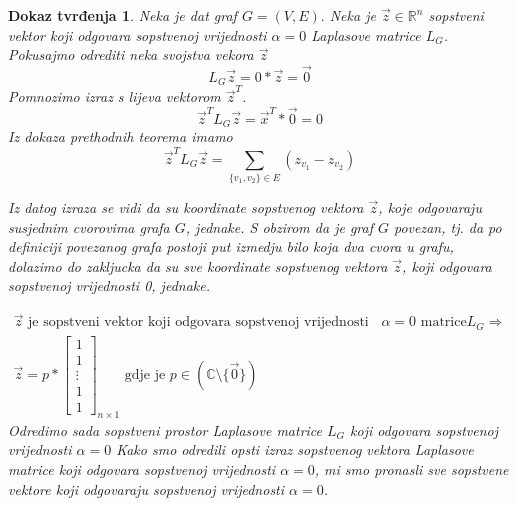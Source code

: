 \documentclass[11pt]{article}
\newtheorem*{custom_proof}{Dokaz tvrđenja}
\begin{document}
	\begin{custom_proof}
	Neka je dat graf $G=(V,E).$ Neka je $\vec{z} \in \mathbb{R}^n$ sopstveni vektor koji odgovara sopstvenoj vrijednosti $\alpha = 0$ Laplasove matrice $L_G$.
	Pokusajmo odrediti neka svojstva vekora $\vec{z}$
	\[
		L_G\vec{z} = 0 * \vec{z} = \vec{0}
	\]
	Pomnozimo izraz s lijeva vektorom $\vec{z}^T$.
	\[
		\vec{z}^TL_G\vec{z} = \vec{x}^T * \vec{0} = 0
	\]
	Iz dokaza prethodnih teorema imamo 
	\[
	\vec{z}^TL_G\vec{z} = \sum_{\{v_1,v_2\} \in E} (z_{v_1} - z_{v_2})
	\]
	
	Iz datog izraza se vidi da su koordinate sopstvenog vektora $\vec{z}$, koje odgovaraju susjednim cvorovima grafa $G$, jednake. S obzirom da je graf $G$ povezan, tj. da po definiciji povezanog grafa postoji put izmedju bilo koja dva cvora u grafu, dolazimo do zakljucka da su sve koordinate sopstvenog vektora $\vec{z}$, koji odgovara sopstvenoj vrijednosti 0, jednake. 
	
	\[
	\begin{split}
	 \vec{z} \text{  je sopstveni vektor koji odgovara sopstvenoj vrijednosti } & \alpha = 0 \text{ matrice}  L_G \Rightarrow \\
	 \vec{z} =p *
	\begin{bmatrix} 
	1 \\ 1 \\ \vdots \\ 1 \\ 1
	\end{bmatrix}_{n \times 1}
	\text{ gdje je } p \in (\mathbb{C} \setminus \{\vec{0}\})
	\end{split}
	\]
	Odredimo sada sopstveni prostor Laplasove matrice $L_G$ koji odgovara sopstvenoj vrijednosti $\alpha = 0$
	Kako smo odredili opsti izraz sopstvenog vektora Laplasove matrice koji odgovara sopstvenoj vrijednosti $\alpha = 0$, mi smo pronasli sve sopstvene vektore koji odgovaraju sopstvenoj vrijednosti $\alpha = 0$.
	

\end{custom_proof}
\end{document}
